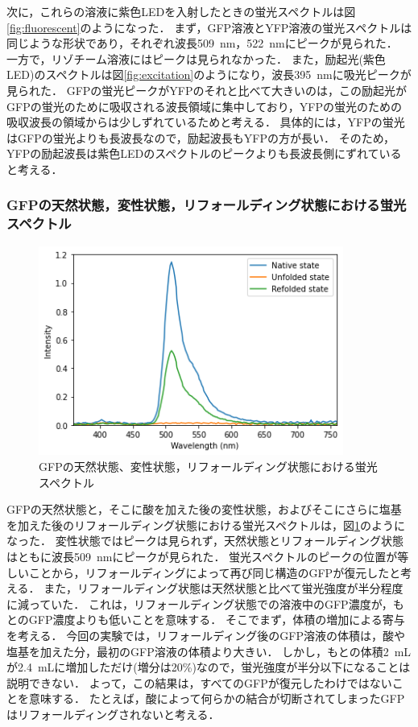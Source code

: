 \documentclass[a4paper,11pt, titlepage]{jsarticle}
\begin{document}
次に，これらの溶液に紫色LEDを入射したときの蛍光スペクトルは図\ref{fig:fluorescent}のようになった．
まず，GFP溶液とYFP溶液の蛍光スペクトルは同じような形状であり，それぞれ波長\SI{509}{\nm}，\SI{522}{\nm}にピークが見られた．
一方で，リゾチーム溶液にはピークは見られなかった．
また，励起光(紫色LED)のスペクトルは図\ref{fig:excitation}のようになり，波長\SI{395}{\nm}に吸光ピークが見られた．
GFPの蛍光ピークがYFPのそれと比べて大きいのは，この励起光がGFPの蛍光のために吸収される波長領域に集中しており，YFPの蛍光のための吸収波長の領域からは少しずれているためと考える．
具体的には，YFPの蛍光はGFPの蛍光よりも長波長なので，励起波長もYFPの方が長い．
そのため，YFPの励起波長は紫色LEDのスペクトルのピークよりも長波長側にずれていると考える．

\subsubsection{GFPの天然状態，変性状態，リフォールディング状態における蛍光スペクトル}

\begin{figure}[htbp]
    \centering
    \includegraphics[width=10cm]{fluore_protein.png}
    \caption{GFPの天然状態、変性状態，リフォールディング状態における蛍光スペクトル}
    \label{fig:fluore_protein}
\end{figure}

GFPの天然状態と，そこに酸を加えた後の変性状態，およびそこにさらに塩基を加えた後のリフォールディング状態における蛍光スペクトルは，図\ref{fig:fluore_protein}のようになった．
変性状態ではピークは見られず，天然状態とリフォールディング状態はともに波長\SI{509}{\nm}にピークが見られた．
蛍光スペクトルのピークの位置が等しいことから，リフォールディングによって再び同じ構造のGFPが復元したと考える．
また，リフォールディング状態は天然状態と比べて蛍光強度が半分程度に減っていた．
これは，リフォールディング状態での溶液中のGFP濃度が，もとのGFP濃度よりも低いことを意味する．
そこでまず，体積の増加による寄与を考える．
今回の実験では，リフォールディング後のGFP溶液の体積は，酸や塩基を加えた分，最初のGFP溶液の体積より大きい．
しかし，もとの体積\SI{2}{\milli\liter}が\SI{2.4}{\milli\liter}に増加しただけ(増分は20\%)なので，蛍光強度が半分以下になることは説明できない．
よって，この結果は，すべてのGFPが復元したわけではないことを意味する．
たとえば，酸によって何らかの結合が切断されてしまったGFPはリフォールディングされないと考える．
\end{document}
